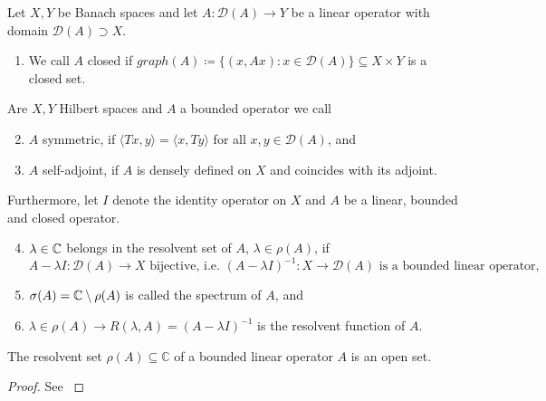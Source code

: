 \begin{definitions}
Let $X, Y$ be Banach spaces and let $A \colon \mathcal{D}(A) \rightarrow Y$ be a linear operator with domain $\mathcal{D}(A) \supset X$. 
\begin{enumerate}[label=\alph*\upshape)]
	\item We call $A$ closed if $graph(A) \coloneqq \{ (x, Ax) : x \in \mathcal{D}(A) \} \subseteq X \times Y$ is a closed set.
\end{enumerate}
Are $X, Y$ Hilbert spaces and $A$ a bounded operator we call
\begin{enumerate}[label=\alph*\upshape)]  \setcounter{enumi}{1}
	\item $A$ symmetric, if $\langle Tx,y \rangle = \langle x ,Ty \rangle$ for all $x,y \in \mathcal{D}(A)$, and
	\item $A$ self-adjoint, if $A$ is densely defined on $X$ and coincides with its adjoint.
\end{enumerate}
Furthermore, let $I$ denote the identity operator on $X$ and $A$ be a linear, bounded and closed operator.
	\begin{enumerate}[label=\alph*\upshape)] \setcounter{enumi}{3}
		\item $\lambda \in \mathbb{C}$ belongs in the resolvent set of $A$, $\lambda \in \rho(A)$, if
			\[  A  - \lambda I \colon \mathcal{D}(A) \rightarrow X \text{ bijective, i.e. } (A - \lambda I)^{-1} \colon X \rightarrow \mathcal{D}(A) \text{ is a bounded linear operator,} \]
		\item $\sigma(A) = \mathbb{C} \setminus \rho(A)$ is called the spectrum of $A$, and
		\item $\lambda \in \rho(A) \rightarrow R(\lambda, A) = (A - \lambda I)^{-1}$ is the resolvent function of $A$.
	\end{enumerate}		
\end{definitions}

\begin{theorem}
	The resolvent set $\rho(A) \subseteq \mathbb{C}$ of a bounded linear operator $A$ is an open set.
	
	\begin{proof}
		See \cite[Chap. 6]{WernerFA}
	\end{proof}
\end{theorem}

